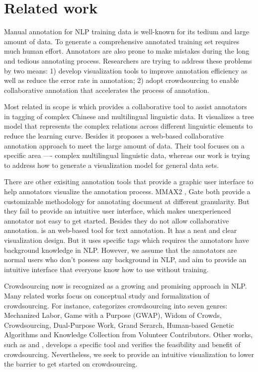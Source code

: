 \section{Related work}
Manual annotation for NLP training data is well-known for its tedium and large amount of data. To generate a comprehensive annotated training set requires much human effort. Annotators are also prone to make mistakes during the long and tedious annotating process. Researchers are trying to address these problems by two means: 1) develop visualization tools to improve annotation efficiency as well as reduce the error rate in annotation; 2) adopt crowdsourcing to enable collaborative annotation that accelerates the process of annotation.

Most related in scope is \cite{yan2012collaborative} which provides a collaborative tool to assist annotators in tagging of complex Chinese and multilingual linguistic data. It visualizes a tree model that represents the complex relations across different linguistic elements to reduce the learning curve. Besides it proposes a web-based collaborative annotation approach to meet the large amount of data. Their tool focuses on a specific area ---- complex multilingual linguistic data, whereas our work is trying to address how to generate a visualization model for general data sets.

There are other exisiting annotation tools that provide a graphic user interface to help annotators visualize the annotation process. MMAX2 \cite{mueller06b}, Gate \cite{gate} both provide a customizable methodology for annotating document at different granularity. But they fail to provide an intuitive user interface, which makes unexperienced annotator not easy to get started. Besides they do not allow collaborative annotation. \cite{brat} is an web-based tool for text annotation. It has a neat and clear visualization design. But it uses specific tags which requires the annotators have background knowledge in NLP. However, we assume that the annotators are normal users who don't possess any background in NLP, and aim to provide an intuitive interface that everyone know how to use without training.

Crowdsourcing now is recognized as a growing and promising approach in NLP. Many related works focus on conceptual study and formalization of crowdsourcing. For instance, \cite{quinn2009taxonomy} categorizes crowdsourcing into seven genres: Mechanized Labor, Game with a Purpose (GWAP), Widom of Crowds, Crowdsourcing, Dual-Purpose Work, Grand Serarch, Human-based Genetic Algorithms and Knowledge Collection from Volunteer Contributors. Other works, such as \cite{abekawa2010community} and \cite{irvine2010using}, develops a specific tool and verifies the feasibility and benefit of crowdsourcing. Nevertheless, we seek to provide an intuitive visualization to lower the barrier to get started on crowdsourcing. 
